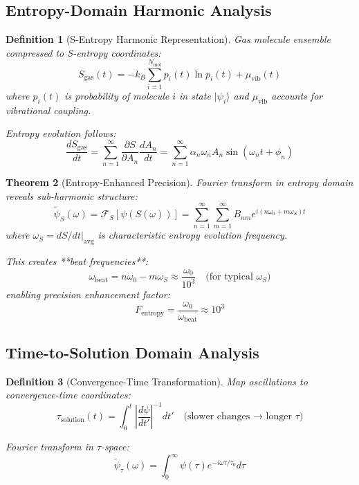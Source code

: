 \documentclass[12pt,a4paper]{article}
\newtheorem{theorem}{Theorem}[section]
\newtheorem{definition}[theorem]{Definition}
\begin{document}
\subsection{Entropy-Domain Harmonic Analysis}

\begin{definition}[S-Entropy Harmonic Representation]
Gas molecule ensemble compressed to S-entropy coordinates:
\begin{equation}
S_{\text{gas}}(t) = -k_B \sum_{i=1}^{N_{\text{mol}}} p_i(t) \ln p_i(t) + \mu_{\text{vib}}(t)
\end{equation}
where $p_i(t)$ is probability of molecule $i$ in state $|\psi_i\rangle$ and $\mu_{\text{vib}}$ accounts for vibrational coupling.

Entropy evolution follows:
\begin{equation}
\frac{dS_{\text{gas}}}{dt} = \sum_{n=1}^{\infty} \frac{\partial S}{\partial A_n} \frac{dA_n}{dt} = \sum_{n=1}^{\infty} \alpha_n \omega_n A_n \sin(\omega_n t + \phi_n)
\end{equation}
\end{definition}

\begin{theorem}[Entropy-Enhanced Precision]
Fourier transform in entropy domain reveals sub-harmonic structure:
\begin{equation}
\tilde{\psi}_S(\omega) = \mathcal{F}_S[\psi(S(\omega))] = \sum_{n=1}^{\infty} \sum_{m=1}^{\infty} B_{nm} e^{i(n\omega_0 + m\omega_S)t}
\end{equation}
where $\omega_S = dS/dt|_{\text{avg}}$ is characteristic entropy evolution frequency.

This creates **beat frequencies**:
\begin{equation}
\omega_{\text{beat}} = n\omega_0 - m\omega_S \approx \frac{\omega_0}{10^3} \quad \text{(for typical } \omega_S)
\end{equation}
enabling precision enhancement factor:
\begin{equation}
F_{\text{entropy}} = \frac{\omega_0}{\omega_{\text{beat}}} \approx 10^3
\end{equation}
\end{theorem}

\subsection{Time-to-Solution Domain Analysis}

\begin{definition}[Convergence-Time Transformation]
Map oscillations to convergence-time coordinates:
\begin{equation}
\tau_{\text{solution}}(t) = \int_0^t \left|\frac{d\psi}{dt'}\right|^{-1} dt' \quad \text{(slower changes → longer } \tau)
\end{equation}

Fourier transform in $\tau$-space:
\begin{equation}
\tilde{\psi}_{\tau}(\omega) = \int_0^{\infty} \psi(\tau) e^{-i\omega\tau/\tau_0} d\tau
\end{equation}
\end{definition}
\end{document}
